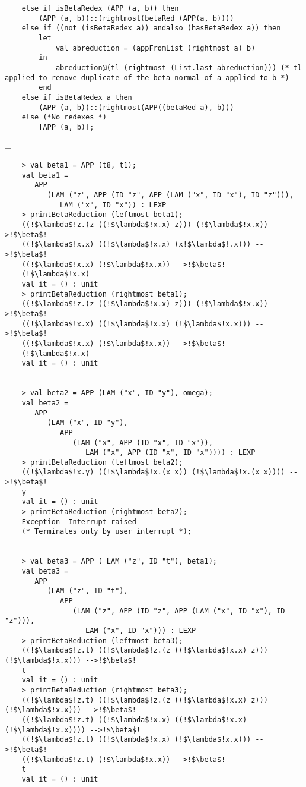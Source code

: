 \documentclass[11pt]{article}
\newenvironment{neverbreak} %
{\par\nobreak\vfil\penalty0\vfilneg
	\vtop\bgroup}
{\par\xdef\tpd{\the\prevdepth}\egroup
	\prevdepth=\tpd}
\begin{document}
\begin{enumerate}
\begin{neverbreak}
\begin{verbatim}
	else if isBetaRedex (APP (a, b)) then
		(APP (a, b))::(rightmost(betaRed (APP(a, b))))
	else if ((not (isBetaRedex a)) andalso (hasBetaRedex a)) then
		let
			val abreduction = (appFromList (rightmost a) b)
		in
			abreduction@(tl (rightmost (List.last abreduction))) (* tl applied to remove duplicate of the beta normal of a applied to b *)
		end
	else if isBetaRedex a then
		(APP (a, b))::(rightmost(APP((betaRed a), b)))
	else (*No redexes *)
		[APP (a, b)];
\end{verbatim}
\end{neverbreak}
\vspace{1cm}
\begin{verbatim}
	> val beta1 = APP (t8, t1);
	val beta1 =
	   APP
	      (LAM ("z", APP (ID "z", APP (LAM ("x", ID "x"), ID "z"))),
	         LAM ("x", ID "x")) : LEXP 
	> printBetaReduction (leftmost beta1);
	((!$\lambda$!z.(z ((!$\lambda$!x.x) z))) (!$\lambda$!x.x)) -->!$\beta$!
	((!$\lambda$!x.x) ((!$\lambda$!x.x) (x!$\lambda$!.x))) -->!$\beta$!
	((!$\lambda$!x.x) (!$\lambda$!x.x)) -->!$\beta$!
	(!$\lambda$!x.x)
	val it = () : unit
	> printBetaReduction (rightmost beta1);
	((!$\lambda$!z.(z ((!$\lambda$!x.x) z))) (!$\lambda$!x.x)) -->!$\beta$!
	((!$\lambda$!x.x) ((!$\lambda$!x.x) (!$\lambda$!x.x))) -->!$\beta$!
	((!$\lambda$!x.x) (!$\lambda$!x.x)) -->!$\beta$!
	(!$\lambda$!x.x)
	val it = () : unit
	
	
	> val beta2 = APP (LAM ("x", ID "y"), omega);
	val beta2 =
	   APP
	      (LAM ("x", ID "y"),
	         APP
	            (LAM ("x", APP (ID "x", ID "x")),
	               LAM ("x", APP (ID "x", ID "x")))) : LEXP
	> printBetaReduction (leftmost beta2);
	((!$\lambda$!x.y) ((!$\lambda$!x.(x x)) (!$\lambda$!x.(x x)))) -->!$\beta$!
	y
	val it = () : unit
	> printBetaReduction (rightmost beta2);
	Exception- Interrupt raised 
	(* Terminates only by user interrupt *);
	
	
	> val beta3 = APP ( LAM ("z", ID "t"), beta1);
	val beta3 =
	   APP
	      (LAM ("z", ID "t"),
	         APP
	            (LAM ("z", APP (ID "z", APP (LAM ("x", ID "x"), ID "z"))),
	               LAM ("x", ID "x"))) : LEXP
	> printBetaReduction (leftmost beta3);
	((!$\lambda$!z.t) ((!$\lambda$!z.(z ((!$\lambda$!x.x) z))) (!$\lambda$!x.x))) -->!$\beta$!
	t
	val it = () : unit
	> printBetaReduction (rightmost beta3);
	((!$\lambda$!z.t) ((!$\lambda$!z.(z ((!$\lambda$!x.x) z))) (!$\lambda$!x.x))) -->!$\beta$!
	((!$\lambda$!z.t) ((!$\lambda$!x.x) ((!$\lambda$!x.x) (!$\lambda$!x.x)))) -->!$\beta$!
	((!$\lambda$!z.t) ((!$\lambda$!x.x) (!$\lambda$!x.x))) -->!$\beta$!
	((!$\lambda$!z.t) (!$\lambda$!x.x)) -->!$\beta$!
	t
	val it = () : unit
\end{verbatim}

\end{enumerate}
\newpage
\end{document}
